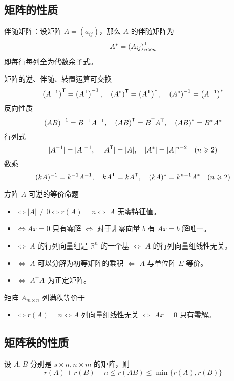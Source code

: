 \subsection{矩阵的性质}

伴随矩阵：设矩阵 $A = (a_{ij})$，那么 $A$ 的伴随矩阵为
\[ A^*= {(A_{ij})}^\mathsf{T}_{n\times n} \]
即每行每列全为代数余子式。

矩阵的逆、伴随、转置运算可交换
\[ {\left(A^{-1}\right)}^\mathsf{T} = \left({A}^\mathsf{T}\right)^{-1}, \quad {\left(A^{*}\right)}^\mathsf{T} = \left({A}^\mathsf{T}\right)^{*}, \quad \left(A^{*}\right)^{-1} = \left(A^{-1}\right)^{*} \]
反向性质
\[ \left(AB\right)^{-1} = B^{-1}A^{-1}, \quad {\left(AB\right)}^\mathsf{T} = {B}^\mathsf{T} {A}^\mathsf{T}, \quad \left(AB\right)^{*} = B^{*}A^{*} \]
行列式
\[ |A^{-1}| = |A|^{-1}, \quad |{A}^\mathsf{T}| = |A|, \quad |A^{*}| = |A|^{n-2} \quad (n \geqslant 2) \]
数乘
\[ (kA)^{-1} = k^{-1} A^{-1}, \quad {kA}^\mathsf{T} = k{A}^\mathsf{T}, \quad (kA)^{*} = k^{n-1} A^{*} \quad (n \geqslant 2) \]

方阵 $A$ 可逆的等价命题
\begin{itemize}
	\item $\Leftrightarrow |A| \neq 0 \Leftrightarrow r(A) = n \Leftrightarrow$ $A$ 无零特征值。
	\item $\Leftrightarrow Ax = 0$ 只有零解 $\Leftrightarrow$ 对于非零向量 $b$ 有 $Ax = b$ 解唯一。
	\item $\Leftrightarrow$ $A$ 的行列向量组是 $\mathbb{R}^n$ 的一个基 $\Leftrightarrow$ $A$ 的行列向量组线性无关。
	\item $\Leftrightarrow$ $A$ 可以分解为初等矩阵的乘积 $\Leftrightarrow$ $A$ 与单位阵 $E$ 等价。
	\item $\Leftrightarrow$ ${A}^\mathsf{T}A$ 为正定矩阵。
\end{itemize}

矩阵 $A_{m \times n}$ 列满秩等价于
\begin{itemize}
	\item $\Leftrightarrow r(A) = n \Leftrightarrow A$ 列向量组线性无关 $\Leftrightarrow$ $Ax = 0$ 只有零解。
\end{itemize}

\subsection{矩阵秩的性质}

\begin{theorem}
	设 $A, B$ 分别是 $s \times n, n \times m$ 的矩阵，则
	\[ r(A) + r(B) - n \leqslant r(AB) \leqslant \min\{r(A),r(B)\} \]
\end{theorem}

